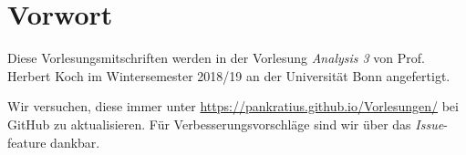 \chapter*{Vorwort}
Diese Vorlesungsmitschriften werden in der Vorlesung \textit{Analysis 3} von Prof. Herbert Koch im Wintersemester 2018/19 an der Universität Bonn angefertigt.\par
Wir versuchen, diese immer unter \url{https://pankratius.github.io/Vorlesungen/} bei GitHub zu aktualisieren. Für Verbesserungsvorschläge sind wir über das \textit{Issue}-feature dankbar.